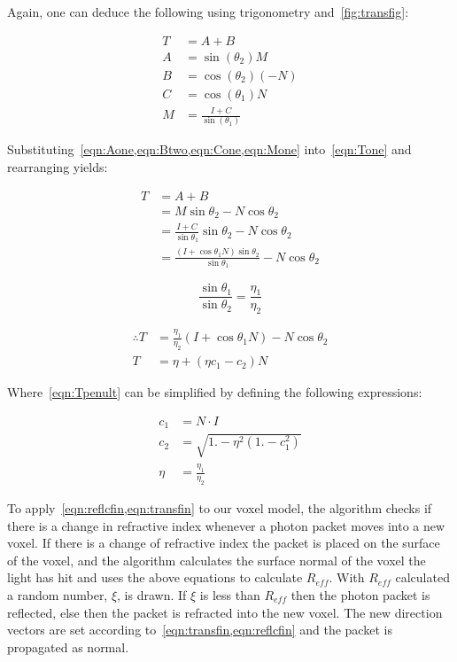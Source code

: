 \begin{appendices}
Again, one can deduce the following using trigonometry and~\cref{fig:transfig}:

\begin{align}
T&=A+B\label{eqn:Tone}\\
A&=\sin\left(\theta_2\right) M\label{eqn:Aone}\\
B&=\cos\left(\theta_2\right)(-N)\label{eqn:Btwo}\\
C&=\cos\left(\theta_1\right)N\label{eqn:Cone}\\
M&=\frac{I+C}{\sin\left(\theta_1\right)}\label{eqn:Mone}
\end{align}

Substituting~\cref{eqn:Aone,eqn:Btwo,eqn:Cone,eqn:Mone} into~\cref{eqn:Tone} and rearranging yields:

\begin{align}
T&=A+B\\
&=M\sin\theta_2-N\cos\theta_2\\
&=\frac{I+C}{\sin\theta_1}\sin\theta_2-N\cos\theta_2\\
&=\frac{(I+\cos\theta_1 N)\sin\theta_2}{\sin\theta_1}-N\cos\theta_2
\end{align}

\begin{equation}
\frac{\sin\theta_1}{\sin\theta_2}=\frac{\eta_1}{\eta_2}
\end{equation}

\begin{align}
\therefore T&=\frac{\eta_1}{\eta_2}\left(I+\cos\theta_1 N\right)-N\cos\theta_2\label{eqn:Tpenult}\\
T&=\eta+\left(\eta c_1-c_2\right)N\label{eqn:transfin}
\end{align}

Where~\cref{eqn:Tpenult} can be simplified by defining the following expressions:

\begin{align}
c_1 &= N \cdot I\label{eqn:c1}\\
c_2 &= \sqrt{1. - \eta^2 (1. - c_1^2)}\label{eqn:c2}\\
\eta&=\frac{\eta_1}{\eta_2}
\end{align}


To apply~\cref{eqn:reflcfin,eqn:transfin} to our voxel model, the algorithm checks if there is a change in refractive index whenever a photon packet moves into a new voxel.
If there is a change of refractive index the packet is placed on the surface of the voxel, and the algorithm calculates the surface normal of the voxel the light has hit and uses the above equations to calculate $R_{eff}$.
With $R_{eff}$ calculated a random number, $\xi$, is drawn.
If $\xi$ is less than $R_{eff}$ then the photon packet is reflected, else then the packet is refracted into the new voxel.
The new direction vectors are set according to~\cref{eqn:transfin,eqn:reflcfin} and the packet is propagated as normal.


\end{appendices}
